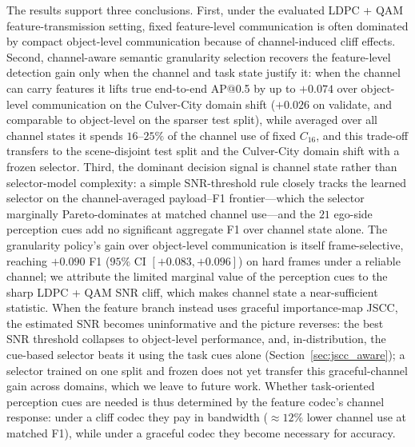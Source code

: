 \documentclass[journal]{IEEEtran}
\begin{document}
The results support three conclusions. First, under the evaluated LDPC + QAM feature-transmission setting, fixed feature-level communication is often dominated by compact object-level communication because of channel-induced cliff effects. Second, channel-aware semantic granularity selection recovers the feature-level detection gain only when the channel and task state justify it: when the channel can carry features it lifts true end-to-end AP@0.5 by up to $+0.074$ over object-level communication on the Culver-City domain shift ($+0.026$ on validate, and comparable to object-level on the sparser test split), while averaged over all channel states it spends $16$--$25\%$ of the channel use of fixed $C_{16}$, and this trade-off transfers to the scene-disjoint test split and the Culver-City domain shift with a frozen selector. Third, the dominant decision signal is channel state rather than selector-model complexity: a simple SNR-threshold rule closely tracks the learned selector on the channel-averaged payload--F1 frontier---which the selector marginally Pareto-dominates at matched channel use---and the $21$ ego-side perception cues add no significant aggregate F1 over channel state alone. The granularity policy's gain over object-level communication is itself frame-selective, reaching $+0.090$ F1 ($95\%$ CI $[+0.083,+0.096]$) on hard frames under a reliable channel; we attribute the limited marginal value of the perception cues to the sharp LDPC + QAM SNR cliff, which makes channel state a near-sufficient statistic. When the feature branch instead uses graceful importance-map JSCC, the estimated SNR becomes uninformative and the picture reverses: the best SNR threshold collapses to object-level performance, and, in-distribution, the cue-based selector beats it using the task cues alone (Section~\ref{sec:jscc_aware}); a selector trained on one split and frozen does not yet transfer this graceful-channel gain across domains, which we leave to future work. Whether task-oriented perception cues are needed is thus determined by the feature codec's channel response: under a cliff codec they pay in bandwidth (${\approx}12\%$ lower channel use at matched F1), while under a graceful codec they become necessary for accuracy.





\end{document}
